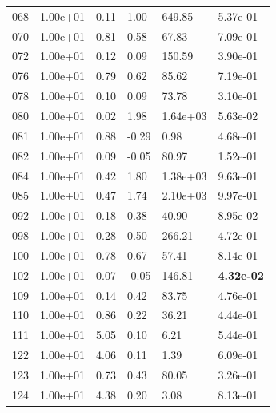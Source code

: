 \begin{figure}[htbp!]
{\begin{minipage}[t]{0.48\linewidth}
\begin{tabular}{llllll}
                    068 & 1.00e+01 & 0.11 & 1.00 & 649.85 & 5.37e-01\\
                    070 & 1.00e+01 & 0.81 & 0.58 & 67.83 & 7.09e-01\\
                    072 & 1.00e+01 & 0.12 & 0.09 & 150.59 & 3.90e-01\\
                    076 & 1.00e+01 & 0.79 & 0.62 & 85.62 & 7.19e-01\\
                    078 & 1.00e+01 & 0.10 & 0.09 & 73.78 & 3.10e-01\\
                    080 & 1.00e+01 & 0.02 & 1.98 & 1.64e+03 & 5.63e-02\\
                    081 & 1.00e+01 & 0.88 & -0.29 & 0.98 & 4.68e-01\\
                    082 & 1.00e+01 & 0.09 & -0.05 & 80.97 & 1.52e-01\\
                    084 & 1.00e+01 & 0.42 & 1.80 & 1.38e+03 & 9.63e-01\\
                    085 & 1.00e+01 & 0.47 & 1.74 & 2.10e+03 & 9.97e-01\\
                    092 & 1.00e+01 & 0.18 & 0.38 & 40.90 & 8.95e-02\\
                    098 & 1.00e+01 & 0.28 & 0.50 & 266.21 & 4.72e-01\\
                    100 & 1.00e+01 & 0.78 & 0.67 & 57.41 & 8.14e-01\\
                    102 & 1.00e+01 & 0.07 & -0.05 & 146.81 & \textbf{4.32e-02}\\
                    109 & 1.00e+01 & 0.14 & 0.42 & 83.75 & 4.76e-01\\
                    110 & 1.00e+01 & 0.86 & 0.22 & 36.21 & 4.44e-01\\
                    111 & 1.00e+01 & 5.05 & 0.10 & 6.21 & 5.44e-01\\
                    122 & 1.00e+01 & 4.06 & 0.11 & 1.39 & 6.09e-01\\
                    123 & 1.00e+01 & 0.73 & 0.43 & 80.05 & 3.26e-01\\
                    124 & 1.00e+01 & 4.38 & 0.20 & 3.08 & 8.13e-01\\
        \bottomrule
        \end{tabular}
    \end{minipage}
    \hspace{0.02\linewidth}
    \begin{minipage}[t]{0.48\linewidth}
        \centering
        \begin{tabular}{llllll}

\end{tabular}
\end{minipage}}
\end{figure}
